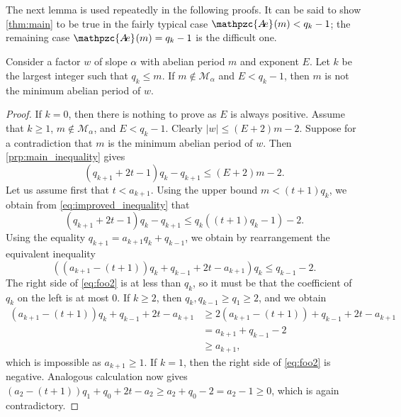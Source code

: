 \documentclass[a4paper,fleqn]{article}
\providecommand{\abs}[1]{\lvert#1\rvert}
\newcommand{\abexp}[2][]{\mathpzc{A\mkern-3mu e}_{#1}(#2)}
\begin{document}
  The next lemma is used repeatedly in the following proofs. It can be said to show \autoref{thm:main} to be true in
  the fairly typical case $\abexp{m} < q_k - 1$; the remaining case $\abexp{m} = q_k - 1$ is the difficult one.

  \begin{lemma}\label{lem:improved_ub}
    Consider a factor $w$ of slope $\alpha$ with abelian period $m$ and exponent $E$. Let $k$ be the largest integer
    such that $q_k \leq m$. If $m \notin \mathcal{M}_\alpha$ and $E < q_k - 1$, then $m$ is not the minimum abelian
    period of $w$.
  \end{lemma}
  \begin{proof}
    If $k = 0$, then there is nothing to prove as $E$ is always positive. Assume that $k \geq 1$,
    $m \notin \mathcal{M}_\alpha$, and $E < q_k - 1$. Clearly $\abs{w} \leq (E + 2)m - 2$. Suppose for a contradiction
    that $m$ is the minimum abelian period of $w$. Then \autoref{prp:main_inequality} gives
    \begin{equation}\label{eq:improved_inequality}
      (q_{k+1} + 2t - 1)q_k - q_{k+1} \leq (E + 2)m - 2.
    \end{equation}
    Let us assume first that $t < a_{k+1}$. Using the upper bound $m < (t + 1)q_k$, we obtain from
    \eqref{eq:improved_inequality} that
    \begin{equation*}
      (q_{k+1} + 2t - 1)q_k - q_{k+1} \leq q_k((t + 1)q_k - 1) - 2.
    \end{equation*}
    Using the equality $q_{k+1} = a_{k+1}q_k + q_{k-1}$, we obtain by rearrangement the equivalent inequality
    \begin{equation}\label{eq:foo2}
      ((a_{k+1} - (t + 1))q_k + q_{k-1} + 2t - a_{k+1})q_k \leq q_{k-1} - 2.
    \end{equation}
    The right side of \eqref{eq:foo2} is at less than $q_k$, so it must be that the coefficient of $q_k$ on the left is
    at most $0$. If $k \geq 2$, then $q_k, q_{k-1} \geq q_1 \geq 2$, and we obtain
    \begin{align*}
      (a_{k+1} - (t + 1))q_k + q_{k-1} + 2t - a_{k+1} &\geq 2(a_{k+1} - (t + 1)) + q_{k-1} + 2t - a_{k+1} \\
                                                      &= a_{k+1} + q_{k-1} - 2 \\
                                                      &\geq a_{k+1},
    \end{align*}
    which is impossible as $a_{k+1} \geq 1$. If $k = 1$, then the right side of \eqref{eq:foo2} is negative. Analogous
    calculation now gives $(a_2 - (t + 1))q_1 + q_0 + 2t - a_2 \geq a_2 + q_0 - 2 = a_2 - 1 \geq 0$, which is again
    contradictory.
    

\end{proof}
\end{document}
